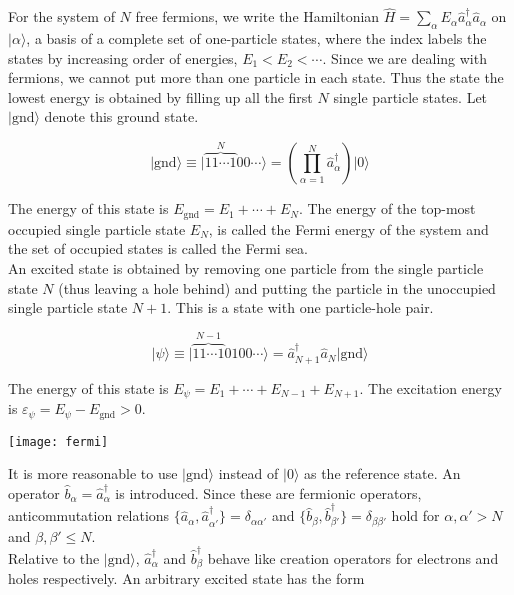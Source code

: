 For the system of $N$ free fermions, we write the Hamiltonian $\hat{H}=\sum_\alpha E_\alpha\hat{a}^\dagger_\alpha\hat{a}_\alpha$ on $|\alpha\rangle$, a basis of a complete set of one-particle states, where the index labels the states by increasing order of energies, $E_1<E_2<\cdots$. Since we are dealing with fermions, we cannot put more than one particle in each state. Thus the state the lowest energy is obtained by filling up all the first $N$ single particle states. Let $|\text{gnd}\rangle$ denote this ground state.

$$|\text{gnd}\rangle\equiv|\overbrace{11\cdots 1}^N 00\cdots\rangle=\left(\prod_{\alpha=1}^N\hat{a}^\dagger_\alpha\right)|0\rangle$$

\noindent The energy of this state is $E_\text{gnd}=E_1+\cdots+E_N$. The energy of the top-most occupied single particle state $E_N$, is called the Fermi energy of the system and the set of occupied states is called the Fermi sea.\\

\noindent An excited state is obtained by removing one particle from the single particle state $N$ (thus leaving a hole behind) and putting the particle in the unoccupied single particle state $N+1$. This is a state with one particle-hole pair.

$$|\psi\rangle\equiv|\overbrace{11\cdots 1}^{N-1}0100\cdots\rangle=\hat{a}^\dagger_{N+1}\hat{a}_N|\text{gnd}\rangle$$

\noindent The energy of this state is $E_\psi=E_1+\cdots+E_{N-1}+E_{N+1}$. The excitation energy is $\varepsilon_\psi=E_\psi-E_\text{gnd}>0$.\\

\begin{center}
    \texttt{[image: fermi]}
\end{center}

\noindent It is more reasonable to use $|\text{gnd}\rangle$ instead of $|0\rangle$ as the reference state. An operator $\hat{b}_\alpha=\hat{a}^\dagger_{\alpha}$ is introduced. Since these are fermionic operators, anticommutation relations $\{\hat{a}_{\alpha},\hat{a}^\dagger_{\alpha'}\}=\delta_{\alpha\alpha'}$ and $\{\hat{b}_{\beta},\hat{b}^\dagger_{\beta'}\}=\delta_{\beta\beta'}$ hold for $\alpha,\alpha'>N$ and $\beta,\beta'\leq N$.\\

\noindent Relative to the $|\text{gnd}\rangle$, $\hat{a}^\dagger_\alpha$ and $\hat{b}^\dagger_\beta$ behave like creation operators for electrons and holes respectively. An arbitrary excited state has the form

